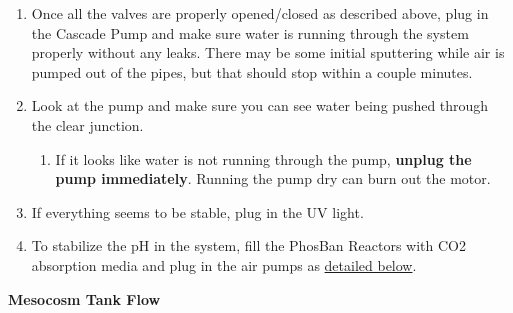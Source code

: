 \documentclass[
]{book}
\providecommand{\tightlist}{%
  \setlength{\itemsep}{0pt}\setlength{\parskip}{0pt}}
\begin{document}
\begin{enumerate}
  \begin{enumerate}
  \def\labelenumii{\arabic{enumii}.}
  \tightlist
  \item
    Once all the valves are properly opened/closed as described above, plug in the Cascade Pump and make sure water is running through the system properly without any leaks. There may be some initial sputtering while air is pumped out of the pipes, but that should stop within a couple minutes.
  \item
    Look at the pump and make sure you can see water being pushed through the clear junction.

    \begin{enumerate}
    \def\labelenumiii{\arabic{enumiii}.}
    \tightlist
    \item
      If it looks like water is not running through the pump, \textbf{unplug the pump immediately}. Running the pump dry can burn out the motor.
    \end{enumerate}
  \item
    If everything seems to be stable, plug in the UV light.
  \item
    To stabilize the pH in the system, fill the PhosBan Reactors with CO2 absorption media and plug in the air pumps as \protect\hyperlink{CO2_Scrubber}{detailed below}.
  \end{enumerate}
\end{enumerate}

\textbf{Mesocosm Tank Flow}
\end{document}
